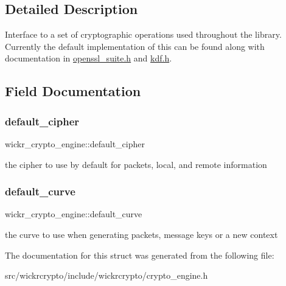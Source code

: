 \subsection{Detailed Description}
Interface to a set of cryptographic operations used throughout the library. Currently the default implementation of this can be found along with documentation in \mbox{\hyperlink{openssl__suite_8h_source}{openssl\+\_\+suite.\+h}} and \mbox{\hyperlink{kdf_8h_source}{kdf.\+h}}. 

\subsection{Field Documentation}
\mbox{\label{structwickr__crypto__engine_a307f7d46b55b1e0a93ce9d9489ba8fc5}} 
\subsubsection{\texorpdfstring{default\+\_\+cipher}{default\_cipher}}
{\footnotesize\ttfamily wickr\+\_\+crypto\+\_\+engine\+::default\+\_\+cipher}

the cipher to use by default for packets, local, and remote information \mbox{\label{structwickr__crypto__engine_a2145e35235dc5c5c944f33ea3d2963bd}} 
\subsubsection{\texorpdfstring{default\+\_\+curve}{default\_curve}}
{\footnotesize\ttfamily wickr\+\_\+crypto\+\_\+engine\+::default\+\_\+curve}

the curve to use when generating packets, message keys or a new context 

The documentation for this struct was generated from the following file\+:\begin{DoxyCompactItemize}
\item 
src/wickrcrypto/include/wickrcrypto/crypto\+\_\+engine.\+h\end{DoxyCompactItemize}
